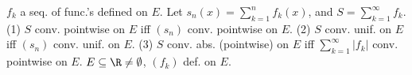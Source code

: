  $f_k$ a seq. of func.'s defined on $E$.
Let $s_n(x) = \sum_{k=1}^n f_k(x)$, and $S = \sum_{k=1}^\infty f_k$.
(1) $S$ conv. pointwise on $E$ iff $(s_n)$ conv. pointwise on $E$.
(2) $S$ conv. unif. on $E$ iff $(s_n)$ conv. unif. on $E$.
(3) $S$ conv. abs. (pointwise) on $E$ iff $\sum_{k=1}^\infty |f_k|$ conv. pointwise on $E$.
 $E \subseteq \R \neq \emptyset$, $(f_k)$ def. on $E$.